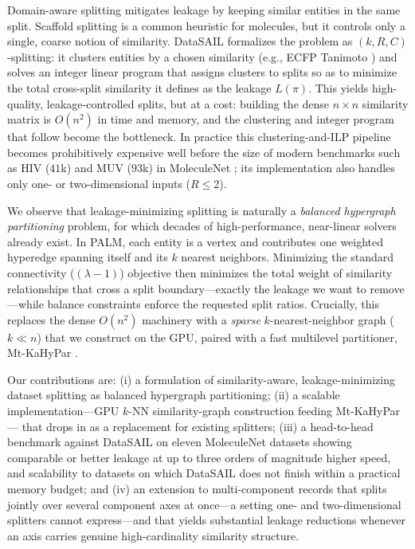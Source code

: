 \documentclass{article}
\begin{document}
Domain-aware splitting mitigates leakage by keeping similar entities in the same
split. Scaffold splitting is a common heuristic for molecules, but it controls
only a single, coarse notion of similarity. DataSAIL \cite{joeres2025}
formalizes the problem as $(k,R,C)$-splitting: it clusters entities by a chosen
similarity (e.g., ECFP Tanimoto \cite{rogers2010ecfp}) and solves an integer
linear program that assigns clusters to splits so as to minimize the total
cross-split similarity it defines as the leakage $L(\pi)$. This yields
high-quality, leakage-controlled splits, but at a cost: building the dense
$n \times n$ similarity matrix is $O(n^2)$ in time and memory, and the clustering
and integer program that follow become the bottleneck. In practice this clustering-and-ILP pipeline
becomes prohibitively expensive well before the size of modern
benchmarks such as HIV ($41$k) and MUV ($93$k) in MoleculeNet
\cite{wu2018moleculenet}; its implementation also handles only one- or
two-dimensional inputs ($R\le 2$).

We observe that leakage-minimizing splitting is naturally a \emph{balanced
hypergraph partitioning} problem, for which decades of high-performance,
near-linear solvers already exist. In PALM, each entity is a vertex and
contributes one weighted hyperedge spanning itself and its $k$ nearest
neighbors. Minimizing the standard connectivity ($(\lambda{-}1)$) objective then
minimizes the total weight of similarity relationships that cross a split
boundary---exactly the leakage we want to remove---while balance constraints
enforce the requested split ratios. Crucially, this replaces the dense $O(n^2)$
machinery with a \emph{sparse} $k$-nearest-neighbor graph ($k \ll n$) that we
construct on the GPU, paired with a fast multilevel partitioner, Mt-KaHyPar
\cite{gottesburen2023}.

Our contributions are: (i) a formulation of similarity-aware, leakage-minimizing
dataset splitting as balanced hypergraph partitioning; (ii) a scalable
implementation---GPU $k$-NN similarity-graph construction feeding Mt-KaHyPar---
that drops in as a replacement for existing splitters; (iii) a head-to-head
benchmark against DataSAIL on eleven MoleculeNet datasets showing comparable or
better leakage at up to three orders of magnitude higher speed, and scalability
to datasets on which DataSAIL does not finish within a practical memory budget;
and (iv) an extension to multi-component records
that splits jointly over several component axes at once---a setting one- and
two-dimensional splitters cannot express---and that yields substantial leakage
reductions whenever an axis carries genuine high-cardinality similarity structure.
\end{document}
